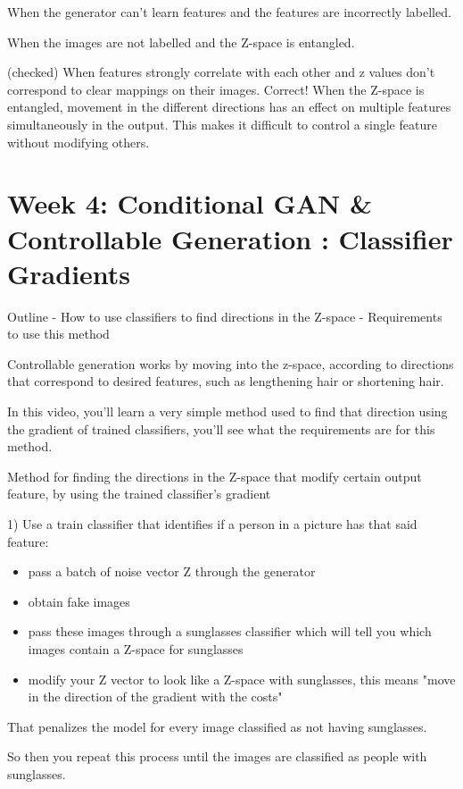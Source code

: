 \documentclass[11pt, onecolumn]{article}
\begin{document}
When the generator can’t learn features and the features are incorrectly labelled.

When the images are not labelled and the Z-space is entangled.

(checked) When features strongly correlate with each other and z values don’t correspond to clear mappings on their images.
Correct! When the Z-space is entangled, movement in the different directions has an effect on multiple features simultaneously in the output. This makes it difficult to control a single feature without modifying others.


\section{Week 4: Conditional GAN \& Controllable Generation : Classifier Gradients}

Outline
- How to use classifiers to find directions in the Z-space
- Requirements to use this method

Controllable generation works by moving into the z-space, according to directions that correspond to desired features, such as lengthening hair or shortening hair.

In this video, you'll learn a very simple method used to find that direction using the gradient of trained classifiers, you'll see what the requirements are for this method.

Method for finding the directions in the Z-space that modify certain output feature, by using the trained classifier's gradient

1) Use a train classifier that identifies if a person in a picture has that said feature: 
\begin{itemize}
\item pass a batch of noise vector Z through the generator
\item obtain fake images
\item pass these images through a sunglasses classifier which will tell you which images contain a Z-space for sunglasses
\item modify your Z vector to look like a Z-space with sunglasses, this means "move in the direction of the gradient with the costs"
\end{itemize}

That penalizes the model for every image classified as not having sunglasses.

So then you repeat this process until the images are classified as people
with sunglasses.
\end{document}
